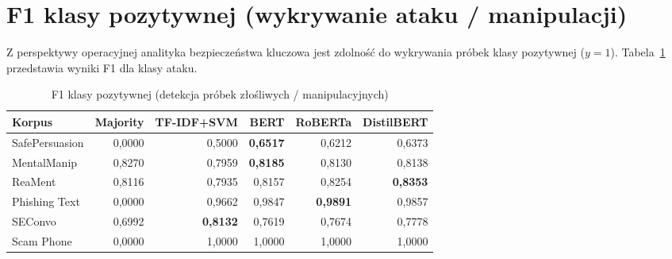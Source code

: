 \documentclass[12pt,a4paper,twoside]{report}
\begin{document}
\section{F1 klasy pozytywnej (wykrywanie ataku / manipulacji)}
Z perspektywy operacyjnej analityka bezpieczeństwa kluczowa jest zdolność do wykrywania próbek klasy pozytywnej ($y=1$). Tabela~\ref{tab:f1pos_main} przedstawia wyniki F1 dla klasy ataku.

\begin{table}[H]\centering
\caption{F1 klasy pozytywnej (detekcja próbek złośliwych / manipulacyjnych)}\label{tab:f1pos_main}
\begin{tabular}{l r r r r r}
\toprule
\rowcolor{headerblue}
\color{white}\textbf{Korpus} &
\color{white}\textbf{Majority} &
\color{white}\textbf{TF-IDF+SVM} &
\color{white}\textbf{BERT} &
\color{white}\textbf{RoBERTa} &
\color{white}\textbf{DistilBERT} \\
\midrule
SafePersuasion & 0,0000 & 0,5000 & \textbf{0,6517} & 0,6212 & 0,6373 \\
MentalManip    & 0,8270 & 0,7959 & \textbf{0,8185} & 0,8130 & 0,8138 \\
ReaMent        & 0,8116 & 0,7935 & 0,8157 & 0,8254 & \textbf{0,8353} \\
Phishing Text  & 0,0000 & 0,9662 & 0,9847 & \textbf{0,9891} & 0,9857 \\
SEConvo        & 0,6992 & \textbf{0,8132} & 0,7619 & 0,7674 & 0,7778 \\
Scam Phone     & 0,0000 & 1,0000 & 1,0000 & 1,0000 & 1,0000 \\
\bottomrule
\end{tabular}
\end{table}
\end{document}
